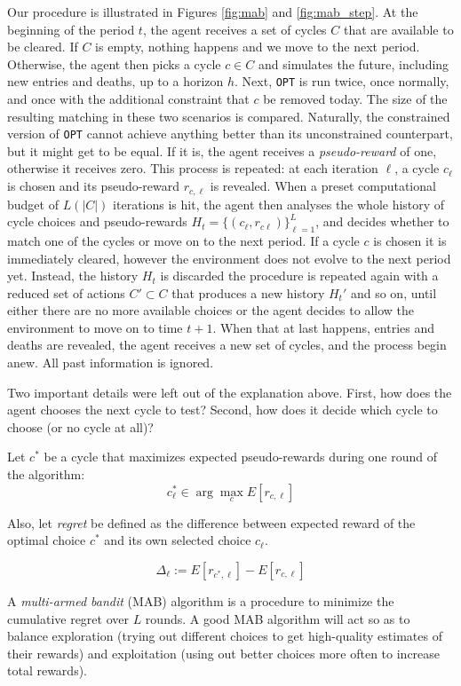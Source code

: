 \documentclass[12pt]{article}
\begin{document}
Our procedure is illustrated in Figures \ref{fig:mab} and \ref{fig:mab_step}. At the beginning of the period $t$, the agent receives a set of cycles $C$ that are available to be cleared. If $C$ is empty, nothing happens and we move to the next period. Otherwise, the agent then picks a cycle $c \in C$ and simulates the future, including new entries and deaths, up to a horizon $h$. Next, \texttt{OPT} is run twice, once normally, and once with the additional constraint that $c$ be removed today. The size of the resulting matching in these two scenarios is compared. Naturally, the constrained version of \texttt{OPT} cannot achieve anything better than its unconstrained counterpart, but it might get to be equal. If it is, the agent receives a \emph{pseudo-reward} of one, otherwise it receives zero. This process is repeated: at each iteration $\ell$, a cycle $c_{\ell}$ is chosen and its pseudo-reward $r_{c, \ell}$ is revealed. When a preset computational budget of $L(|C|)$ iterations is hit, the agent then analyses the whole history of cycle choices and pseudo-rewards $H_{t} = \{ (c_{\ell}, r_{c\ell} ) \}_{\ell=1}^{L}$, and decides whether to match one of the cycles or move on to the next period. If a cycle $c$ is chosen it is immediately cleared, however the environment does not evolve to the next period yet. Instead, the history $H_t$ is discarded the procedure is repeated again with a reduced set of actions $C' \subset C$ that produces a new history $H_t'$ and so on, until either there are no more available choices or the agent decides to allow the environment to move on to time $t+1$. When that at last happens, entries and deaths are revealed, the agent receives a new set of cycles, and the process begin anew. All past information is ignored.


Two important details were left out of the explanation above. First, how does the agent chooses the next cycle to test? Second, how does it decide which cycle to choose (or no cycle at all)? 

Let $c^{*}$ be a cycle that maximizes expected pseudo-rewards during one round of the algorithm:
$$c_{\ell}^{*} \in \arg\max_{c} E[r_{c,\ell}] $$


 Also, let \emph{regret} be defined as the difference between expected reward of the optimal choice $c^*$ and its own selected choice $c_{\ell}$.
 
 $$\Delta_\ell := E[r_{c^{*},\ell}] - E[r_{c,\ell}]$$
 
 A \emph{multi-armed bandit} (MAB) algorithm is a procedure to minimize the cumulative regret over $L$ rounds. A good MAB algorithm will act so as to balance exploration (trying out different choices to get high-quality estimates of their rewards) and exploitation (using out better choices more often to increase total rewards). 
 
\end{document}
